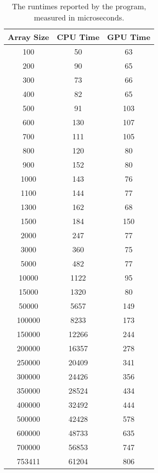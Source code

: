 \begin{table}
    \center
    \begin{tabular}{|c|c|c|}
        \hline
        \textbf{Array Size} & \textbf{CPU Time} & \textbf{GPU Time} \\\hline
           100 &    50 &  63 \\
           200 &    90 &  65 \\
           300 &    73 &  66 \\
           400 &    82 &  65 \\
           500 &    91 & 103 \\
           600 &   130 & 107 \\
           700 &   111 & 105 \\
           800 &   120 &  80 \\
           900 &   152 &  80 \\
          1000 &   143 &  76 \\
          1100 &   144 &  77 \\
          1300 &   162 &  68 \\
          1500 &   184 & 150 \\
          2000 &   247 &  77 \\
          3000 &   360 &  75 \\
          5000 &   482 &  77 \\
         10000 &  1122 &  95 \\
         15000 &  1320 &  80 \\
         50000 &  5657 & 149 \\
        100000 &  8233 & 173 \\
        150000 & 12266 & 244 \\
        200000 & 16357 & 278 \\
        250000 & 20409 & 341 \\
        300000 & 24426 & 356 \\
        350000 & 28524 & 434 \\
        400000 & 32492 & 444 \\
        500000 & 42428 & 578 \\
        600000 & 48733 & 635 \\
        700000 & 56853 & 747 \\
        753411 & 61204 & 806 \\\hline
    \end{tabular}
    \caption{The runtimes reported by the program, measured in microseconds.}
    \label{tab:times}
\end{table}


